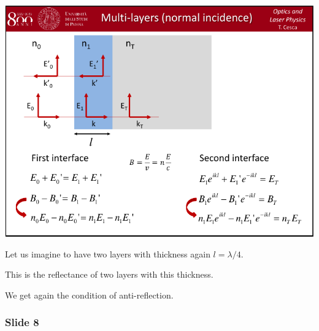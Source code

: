 \documentclass[../main/main.tex]{subfiles}
\begin{document}
\begin{minipage}[]{0.5\linewidth}
\centering
\includegraphics[page=7,width=1\textwidth]{../lessons/pdf_file/06_lecture.pdf}
\end{minipage}
\hspace{0.3cm}\vspace{0.3cm}
\begin{minipage}[c]{0.47\linewidth}

Let us imagine to have two layers with thickness again \( l = \lambda /4 \).

This is the reflectance of two layers with this thickness.

We get again the condition of anti-reflection.

\end{minipage}

\subsubsection*{Slide 8}
\end{document}
